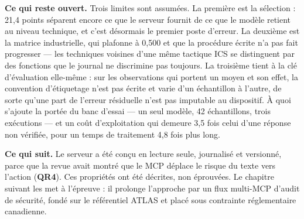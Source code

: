 \textbf{Ce qui reste ouvert.} Trois limites sont assumées. La première est la sélection : 21,4 points séparent encore ce que le serveur fournit de ce que le modèle retient au niveau technique, et c'est désormais le premier poste d'erreur. La deuxième est la matrice industrielle, qui plafonne à 0,500 et que la procédure écrite n'a pas fait progresser --- les techniques voisines d'une même tactique ICS se distinguent par des fonctions que le journal ne discrimine pas toujours. La troisième tient à la clé d'évaluation elle-même : sur les observations qui portent un moyen et son effet, la convention d'étiquetage n'est pas écrite et varie d'un échantillon à l'autre, de sorte qu'une part de l'erreur résiduelle n'est pas imputable au dispositif. À quoi s'ajoute la portée du banc d'essai --- un seul modèle, 42 échantillons, trois exécutions --- et un coût d'exploitation qui demeure 3,5 fois celui d'une réponse non vérifiée, pour un temps de traitement 4,8 fois plus long.

\textbf{Ce qui suit.} Le serveur a été conçu en lecture seule, journalisé et versionné, parce que la revue avait montré que le MCP déplace le risque du texte vers l'action (\textbf{QR4}). Ces propriétés ont été décrites, non éprouvées. Le chapitre suivant les met à l'épreuve : il prolonge l'approche par un flux multi-MCP d'audit de sécurité, fondé sur le référentiel ATLAS et placé sous contrainte réglementaire canadienne.
